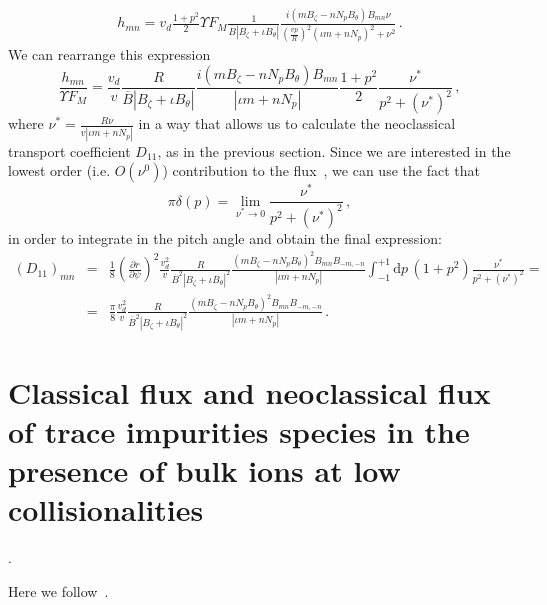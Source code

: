  \begin{eqnarray}
 h_{mn} =  v_d\frac{1+p^2}{2}\Upsilon F_M\frac{1}{\overline{B}|B_\zeta+\iota B_\theta|}\frac{i(mB_\zeta-nN_pB_\theta)B_{mn}\nu}{\left(\frac{vp}{R}\right)^2(\iota m + nN_p)^2+\nu^2}\,.
 \end{eqnarray}
 We can rearrange this expression
 \begin{equation}
 \frac{h_{mn}}{\Upsilon F_M} = \frac{v_d}{v}\frac{R}{\overline{B}|B_\zeta+\iota B_\theta|}\frac{i(mB_\zeta-nN_pB_\theta)B_{mn}}{|\iota m+nN_p|}\frac{1+p^2}{2}\frac{\nu^*}{p^2+(\nu^*)^2}\,,
 \end{equation}
 where $\nu^*=\frac{R\nu}{v|\iota m +nN_p|}$ in a way that allows us to calculate the neoclassical transport coefficient $D_{11}$, as in the previous section. Since we are interested in the lowest order (i.e. $O(\nu^0)$) contribution to the flux~\citep{notes_plateau}, we can use the fact that
 \begin{equation}
 \pi \delta(p)=\lim_{\nu^*\rightarrow 0}\frac{\nu^*}{p^2+(\nu^*)^2}\,,
 \end{equation}
 in order to integrate in the pitch angle and obtain the final expression:
 \begin{eqnarray}
 (D_{11})_{mn}&=& \frac{1}{8}\left(\frac{\partial r}{\partial\psi}\right)^2 \frac{v_d^2}{v}\frac{R}{\overline{B}^2|B_\zeta+\iota B_\theta|^2}\frac{(mB_\zeta-nN_pB_\theta)^2B_{mn}B_{-m,-n}}{|\iota m+nN_p|}\int_{-1}^{+1}\mathrm{d}p\,(1+p^2)\frac{\nu^*}{p^2+(\nu^*)^2} = \nonumber\\ &=& \frac{\pi}{8} \frac{v_d^2}{v}\frac{R}{\overline{B}^2|B_\zeta+\iota B_\theta|^2}\frac{(mB_\zeta-nN_pB_\theta)^2B_{mn}B_{-m,-n}}{|\iota m+nN_p|}\,.\label{EQ_D11PLATEAU}
 \end{eqnarray}


\section{Classical flux and neoclassical flux of trace impurities species in the presence of bulk ions at low collisionalities}\label{SEC_CLANC}.

Here we follow~\citep{calvo2018nf,calvo2019anis}.


